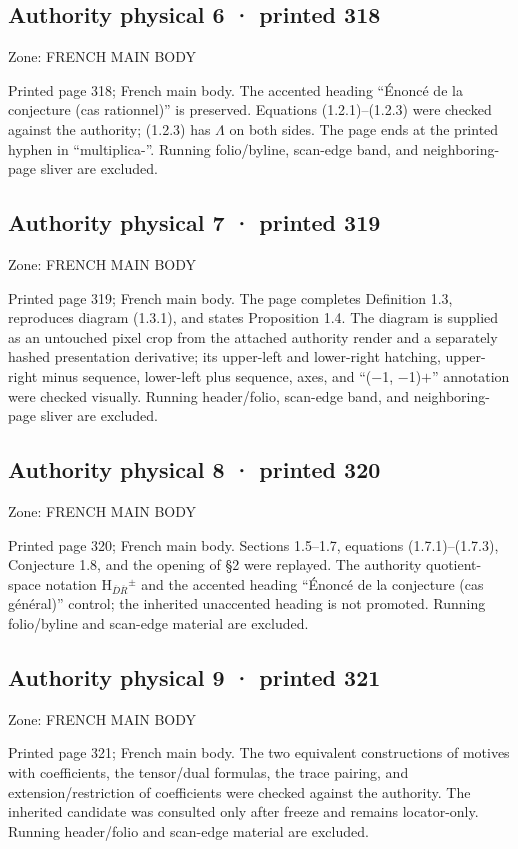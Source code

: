 \documentclass[10pt,twoside]{article}
\begin{document}
\subsection*{Authority physical 6 · printed 318}
\noindent\textsf{Zone: FRENCH MAIN BODY}\par
Printed page 318; French main body. The accented heading “Énoncé de la conjecture (cas rationnel)” is preserved. Equations (1.2.1)–(1.2.3) were checked against the authority; (1.2.3) has \ensuremath{Λ} on both sides. The page ends at the printed hyphen in “multiplica-”. Running folio/byline, scan-edge band, and neighboring-page sliver are excluded.\par
\subsection*{Authority physical 7 · printed 319}
\noindent\textsf{Zone: FRENCH MAIN BODY}\par
Printed page 319; French main body. The page completes Definition 1.3, reproduces diagram (1.3.1), and states Proposition 1.4. The diagram is supplied as an untouched pixel crop from the attached authority render and a separately hashed presentation derivative; its upper-left and lower-right hatching, upper-right minus sequence, lower-left plus sequence, axes, and “(\ensuremath{−}1, \ensuremath{−}1)\ensuremath{+}” annotation were checked visually. Running header/folio, scan-edge band, and neighboring-page sliver are excluded.\par
\subsection*{Authority physical 8 · printed 320}
\noindent\textsf{Zone: FRENCH MAIN BODY}\par
Printed page 320; French main body. Sections 1.5–1.7, equations (1.7.1)–(1.7.3), Conjecture 1.8, and the opening of \S{}2 were replayed. The authority quotient-space notation H\ensuremath{_{\overline{D}\overline{R}}}\ensuremath{^{±}} and the accented heading “Énoncé de la conjecture (cas général)” control; the inherited unaccented heading is not promoted. Running folio/byline and scan-edge material are excluded.\par
\subsection*{Authority physical 9 · printed 321}
\noindent\textsf{Zone: FRENCH MAIN BODY}\par
Printed page 321; French main body. The two equivalent constructions of motives with coefficients, the tensor/dual formulas, the trace pairing, and extension/restriction of coefficients were checked against the authority. The inherited candidate was consulted only after freeze and remains locator-only. Running header/folio and scan-edge material are excluded.\par
\end{document}

